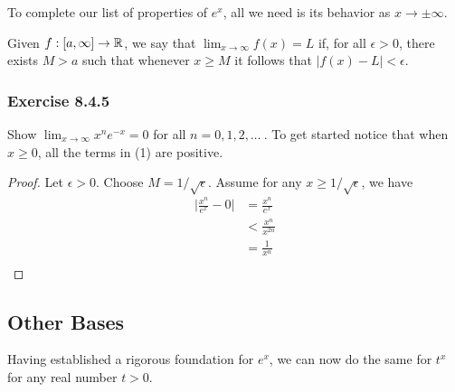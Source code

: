 To complete our list of properties of \( e^{x}  \), all we need is its behavior as \( x \to \pm \infty  \).

\begin{definition}{}{}
    Given \( f : [a,\infty ]  \to \mathbb{R} \), we say that \( \lim_{ x \to \infty  }  f(x) = L  \) if, for all \( \epsilon > 0  \), there exists \( M > a  \) such that whenever \( x \geq M  \) it follows that \( |  f(x) - L  | < \epsilon  \).
\end{definition}

\subsubsection{Exercise 8.4.5} Show \( \lim_{ x \to \infty  }  x^{n} e^{-x} = 0  \) for all \( n = 0,1,2, \dots \ \). To get started notice that when \( x \geq 0   \), all the terms in (1) are positive.
\begin{proof}
Let \( \epsilon > 0  \). Choose \( M =  1 / \sqrt{ \epsilon  } \). Assume for any \( x \geq 1 /\sqrt{ \epsilon  }  \), we have 
\begin{align*}
    \Big| \frac{ x^{n}  }{  e^{x} } - 0  \Big| &= \frac{ x^{n}  }{ e^{x} }   \\
                                               &< \frac{ x^{n}  }{  x^{2n} } \\
                                               &= \frac{ 1 }{ x^{n} } \\
\end{align*}
\end{proof}

\subsection{Other Bases}

Having established a rigorous foundation for \( e^{x}  \), we can now do the same for \( t^{x}  \) for any real number \( t > 0   \). 

